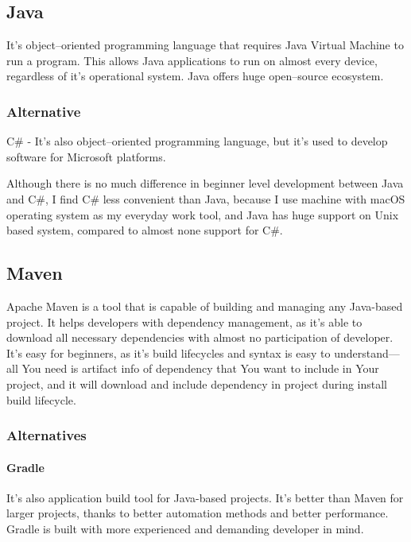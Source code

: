 \documentclass[a4paper,twoside,12pt]{book}
\begin{document}
    \subsection{Java}
      It's object--oriented programming language that requires Java Virtual Machine to run a program. 
      This allows Java applications to run on almost every device, regardless of it's operational system\cite{bib:horstmann2008core}.
      Java offers huge open--source ecosystem.

      \subsubsection{Alternative}
        C\# - It's also object--oriented programming language, but it's used to develop software for Microsoft platforms\cite{bib:thai2003net}.

      Although there is no much difference in beginner level development between Java and C\#, I find C\# less convenient than Java,
      because I use machine with macOS operating system as my everyday work tool, and Java has huge support on Unix based system, compared to almost none support for C\#.

    \subsection{Maven}
      Apache Maven is a tool that is capable of building and managing any Java-based project. 
      It helps developers with dependency management, as it's able to download all necessary dependencies with almost no participation of developer.
      It's easy for beginners, as it's build lifecycles and syntax is easy to understand---all You need is artifact info of dependency that You want to include in Your project, 
      and it will download and include dependency in project during install build lifecycle\cite{bib:maven}.

      \subsubsection{Alternatives}
        \paragraph{Gradle}
          It's also application build tool for Java-based projects. It's better than Maven for larger projects, thanks to better automation methods and better performance.
          Gradle is built with more experienced and demanding developer in mind\cite{bib:gradle}.
        
\end{document}
